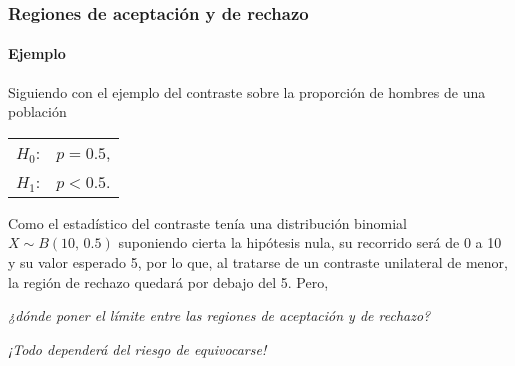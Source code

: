 \begin{frame}
\frametitle{Regiones de aceptación y de rechazo}
\framesubtitle{Ejemplo}
Siguiendo con el ejemplo del contraste sobre la proporción de hombres de una población
\begin{center}
\begin{tabular}{ll}
$H_0$: & $p=0.5$,\\
$H_1$: & $p<0.5$.
\end{tabular}
\end{center}
Como el estadístico del contraste tenía una distribución binomial $X\sim B(10,\,0.5)$ suponiendo cierta la hipótesis
nula, su recorrido será de 0 a 10 y su valor esperado 5, por lo que, al tratarse de un contraste unilateral de menor, la
región de rechazo quedará por debajo del 5. Pero,
\begin{center}
\emph{¿dónde poner el límite entre las regiones de aceptación y de rechazo?}

\begin{center}
\end{center}

\alert{\emph{¡Todo dependerá del riesgo de equivocarse!}}
\end{center}
\end{frame}


